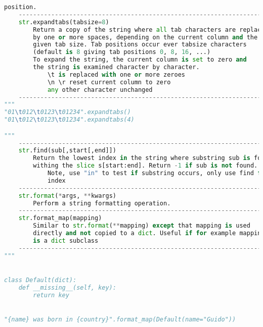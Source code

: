\documentclass[a4paper,landscape]{report}
\begin{document}
\begin{lstlisting}[language=Python]
        position.
    ---------------------------------------------------------------------
    str.expandtabs(tabsize=8)
        Return a copy of the string where all tab characters are replaced
        by one or more spaces, depending on the current column and the
        given tab size. Tab positions occur ever tabsize characters
        (default is 8 giving tab positions 0, 8, 16, ...)
        To expand the string, the current column is set to zero and
        the string is examined character by character.
            \t is replaced with one or more zeroes
            \n \r reset current column to zero
            any other character unchanged
    ---------------------------------------------------------------------
"""
"01\t012\t0123\t01234".expandtabs()
"01\t012\t0123\t01234".expandtabs(4)

"""
    ---------------------------------------------------------------------
    str.find(sub[,start[,end]])
        Return the lowest index in the string where substring sub is found
        withing the slice s[start:end]. Return -1 if sub is not found.
            Note, use "in" to test if substring occurs, only use find for
            index
    ---------------------------------------------------------------------
    str.format(*args, **kwargs)
        Perform a string formatting operation.
    ---------------------------------------------------------------------
    str.format_map(mapping)
        Similar to str.format(**mapping) except that mapping is used
        directly and not copied to a dict. Useful if for example mapping
        is a dict subclass
    ---------------------------------------------------------------------
"""


class Default(dict):
    def __missing__(self, key):
        return key


"{name} was born in {country}".format_map(Default(name="Guido"))


\end{lstlisting}
\end{document}
